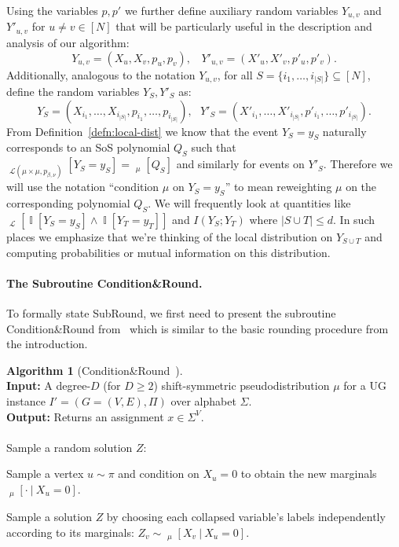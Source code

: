 \documentclass[11pt]{article}
\DeclareMathOperator*{\pE}{\widetilde{\mathbb{E}}}
\DeclareMathOperator*{\pPr}{\widetilde{\Pr}}
\DeclareMathOperator*{\Ind}{\mathbb{I}}
\newcommand\skipi{{\vskip 10pt}}
\def \cL {\mathcal{L}}
\def \sos {SoS\xspace}
\theoremstyle{definition}
\newtheorem{algorithm-thm}[theorem]{Algorithm}
\begin{document}
Using the variables $p,p'$ we further define auxiliary random variables $Y_{u,v}$ and $Y'_{u,v}$ for $u \neq v \in [N]$ that will be particularly useful in the description and analysis of our algorithm: 
\begin{equation}
Y_{u,v} = (X_u,X_v,p_u,p_v), ~~~~ Y'_{u,v} = (X'_u,X'_v,p'_u,p'_v).
\end{equation}
Additionally, analogous to the notation $Y_{u,v}$, for all $S = \{i_1,\ldots,i_{|S|}\} \subseteq [N]$, define the random variables $Y_S, Y'_S$ as: 
\[Y_S = (X_{i_1}, \ldots, X_{i_{|S|}}, p_{i_1}, \ldots, p_{i_{|S|}}), ~~~ Y'_S = (X'_{i_1}, \ldots, X'_{i_{|S|}}, p'_{i_1}, \ldots, p'_{i_{|S|}}).\]
From Definition~\ref{defn:local-dist} we know that the event $Y_S = y_S$ naturally corresponds to an \sos polynomial $Q_S$ such that $\pPr_{{\cL}(\mu \times \mu, p_{\beta,\nu})}[Y_S = y_S] = \pE_{\mu}[Q_S]$ and similarly for events on $Y'_S$. Therefore we will use the notation ``condition $\mu$ on $Y_S = y_S$'' to mean reweighting $\mu$ on the corresponding polynomial $Q_S$. We will frequently look at quantities like $\pPr_{\cL}[\Ind[Y_S = y_S] \wedge \Ind[Y_T = y_T]]$ and $I(Y_S;Y_T)$ where $|S \cup T| \leq d$. In such places we emphasize that we're thinking of the local distribution on $Y_{S \cup T}$ and computing probabilities or mutual information on this distribution.

\skipi
\paragraph{The Subroutine Condition\&Round.}
To formally state SubRound, we first need to present
the subroutine Condition\&Round from~\cite{BBKSS} which is similar to 
the basic rounding procedure from the introduction.
\begin{algorithm-thm}[Condition\&Round~\cite{BBKSS}]\label{alg:low-ent-restated} ~\\ 
\textbf{Input:} A degree-$D$ (for $D \geq 2$) 
shift-symmetric pseudodistribution
$\mu$ for a UG  instance $I'=(G=(V,E),\Pi)$ over alphabet $\Sigma$.  \\
\textbf{Output:} Returns an assignment $x \in \Sigma^V$. %
\\\\
Sample a random solution $Z$:
\begin{compactenum}
\item Sample a vertex $u \sim \pi$ and condition on $X_{u} = 0$ to obtain the new marginals $\pE_\mu[\cdot ~|~ X_{u} = 0]$.
\item Sample a solution $Z$ by choosing each collapsed variable's labels independently according to its marginals: $Z_v \sim \pE_\mu[X_v ~|~ X_{u} = 0]$.
\end{compactenum}
\end{algorithm-thm}
\end{document}
